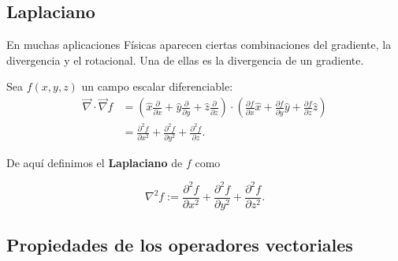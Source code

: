 \subsection*{Laplaciano}

En muchas aplicaciones Físicas aparecen ciertas combinaciones del gradiente, la divergencia y el rotacional. Una de ellas es la divergencia de un gradiente.

Sea $f(x,y,z)$ un campo escalar diferenciable:
\begin{align*}
    \vec{\nabla} \cdot \vec{\nabla} f &=  \left( \hat{x} \frac{\partial}{\partial x}  + \hat{y} \frac{\partial}{\partial y}   + \hat{z}\frac{\partial}{\partial z}  \right) \cdot \left( \frac{\partial f}{\partial x} \hat{x} + \frac{\partial f}{\partial y} \hat{y} + \frac{\partial f}{\partial z} \hat{z} \right) \\
&= \frac{\partial^2 f }{\partial x^2} + \frac{\partial^2 f}{\partial y^2} + \frac{\partial^2 f}{\partial z} .  
\end{align*}

De aquí definimos el \textbf{Laplaciano} de $f$ como
\begin{shaded}
    $$\nabla^2 f := \frac{\partial^2 f }{\partial x^2} + \frac{\partial^2 f}{\partial y^2} + \frac{\partial^2 f}{\partial z^2}.$$
\end{shaded}

\subsection*{Propiedades de los operadores vectoriales}

